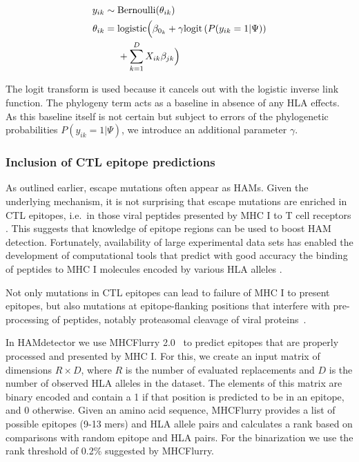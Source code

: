 \documentclass{bioinfo}
\begin{document}
\begin{methods}
\begin{equation}
\begin{aligned}
  y_{ik}  & \sim \text{Bernoulli}(\theta_{ik}) \\
  \theta_{ik}  & =  \text{logistic}\Bigl(\beta_{0_{k}} + \gamma \text{logit}\left(P(y_{ik}=1|\Psi)\right) \\
  &\;\;\;\;\; + \sum_{k=1}^{D}X_{ik}\beta_{jk}\Bigr)
  \label{eq:phylogeny}
\end{aligned}
\end{equation}


The logit transform is used because it cancels out with the logistic inverse link function. The phylogeny term acts as a baseline in absence of any HLA effects. As this baseline itself is not certain but subject to errors of the phylogenetic probabilities $P(y_{ik}=1|\Psi)$, we introduce an additional parameter $\gamma$.

\subsubsection{Inclusion of CTL epitope predictions}


As outlined earlier, escape mutations often appear as HAMs. Given the underlying mechanism, it is not surprising that escape mutations are enriched in CTL epitopes, i.e.\ in those viral peptides presented by MHC I to T cell receptors \citep{Bronke2013}. This suggests that knowledge of epitope regions can be used to boost HAM detection. Fortunately, availability of large experimental data sets \citep{Vita2019} has enabled the development of computational tools that predict with good accuracy the binding of peptides to MHC I molecules encoded by various HLA alleles \citep{Mei2020}. 

Not only mutations in CTL epitopes can lead to failure of MHC I to present epitopes, but also mutations at epitope-flanking positions that interfere with pre-processing of peptides, notably proteasomal cleavage of viral proteins~\citep{Milicic2005, Gall2007}.

In HAMdetector we use MHCFlurry 2.0~\citep{ODonnell2020} to predict epitopes that are properly processed and presented by MHC I. For this, we create an input matrix of dimensions $R\times D$, where $R$ is the number of evaluated replacements and $D$ is the number of observed HLA alleles in the dataset. The elements of this matrix are binary encoded and contain a 1 if that position is predicted to be in an epitope, and 0 otherwise. Given an amino acid sequence, MHCFlurry provides a list of possible epitopes (9-13 mers) and HLA allele pairs and calculates a rank based on comparisons with random epitope and HLA pairs. For the binarization we use the rank threshold of 0.2\% suggested by MHCFlurry.


\end{methods}
\end{document}
